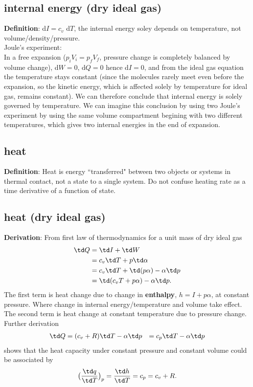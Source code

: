 \subsection{internal energy (dry ideal gas)}
{\bf{Definition}}: d$I = c_v$ d$T$, the internal energy soley depends on temperature, not
volume/density/pressure. \\

{Joule's experiment:} \\
In a free expansion ($p_iV_i = p_fV_f$, pressure change is completely balanced by volume change),
d$W = 0$, d$Q = 0$ hence d$I = 0$, and from the ideal gas equation the temperature stays constant
(since the molecules rarely meet even before the expansion, so the kinetic energy, which is affected
solely by temperature for ideal gas, remains constant). We can therefore conclude that internal
energy is solely governed by temperature. We can imagine this conclusion by using two Joule's
experiment by using the same volume compartment begining with two different temperatures, which
gives two internal energies in the end of expansion. 


\subsection{heat}
{\bf{Definition}}: Heat is energy ``transferred" between two objects or systems in thermal contact, not
a state to a single system. Do not confuse heating rate as a time derivative of a function of state.


\subsection{heat (dry ideal gas)}
{\bf{Derivation}}: From first law of thermodynamics for a unit mass of dry ideal gas
\begin{equation}
\begin{aligned}
  \td Q & = \td I + \td W \\
        & = c_v \td T + p \td \alpha \\
        & = c_v \td T + \td(p\alpha) - \alpha \td p \\
        & = \td (c_v T + p\alpha) - \alpha \td p. 
\end{aligned}
\end{equation}
The first term is heat change due to change in {\bf{enthalpy}}, $h = I + p\alpha$, at constant
pressure. Where change in internal energy/temperature and volume take effect. The second
term is heat change at constant temperature due to pressure change. Further derivation 
\begin{equation}
\begin{aligned}
  \td Q & = (c_v + R) \td T - \alpha \td p
        & = c_p \td T - \alpha \td p
\end{aligned}
\end{equation}
shows that the heat capacity under constant pressure and constant volume could be associated by
\begin{equation}
  \big( \frac{\td q}{\td T} \big)_p = \frac{\td h}{\td T} =  c_p = c_v + R.
\end{equation}

